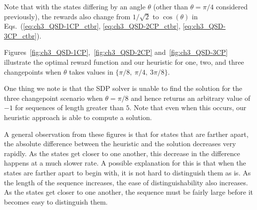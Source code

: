 \begin{appendices}

Note that with the states differing by an angle $\theta$ (other than $\theta = \pi/4$ considered previously), the rewards also change from $1/\sqrt{2}$ to $\cos(\theta)$ in Eqs.~(\eqref{eq:ch3_QSD-1CP_ctbr}, \eqref{eq:ch3_QSD-2CP_ctbr}, \eqref{eq:ch3_QSD-3CP_ctbr}).

Figures~\ref{fig:ch3_QSD-1CP},~\ref{fig:ch3_QSD-2CP} and~\ref{fig:ch3_QSD-3CP} illustrate the optimal reward function and our heuristic for one, two, and three changepoints when $\theta$ takes values in $\{\pi/8,\ \pi/4,\ 3\pi/8\}$.

One thing we note is that the SDP solver is unable to find the solution for the three changepoint scenario when $\theta = \pi/8$ and hence returns an arbitrary value of $-1$ for sequences of length greater than $5$.
Note that even when this occurs, our heuristic approach is able to compute a solution.

A general observation from these figures is that for states that are farther apart, the absolute difference between the heuristic and the solution decreases very rapidly.
As the states get closer to one another, this decrease in the difference happens at a much slower rate.
A possible explanation for this is that when the states are farther apart to begin with, it is not hard to distinguish them as is.
As the length of the sequence increases, the ease of distinguishability also increases.
As the states get closer to one another, the sequence must be fairly large before it becomes easy to distinguish them.


\end{appendices}
